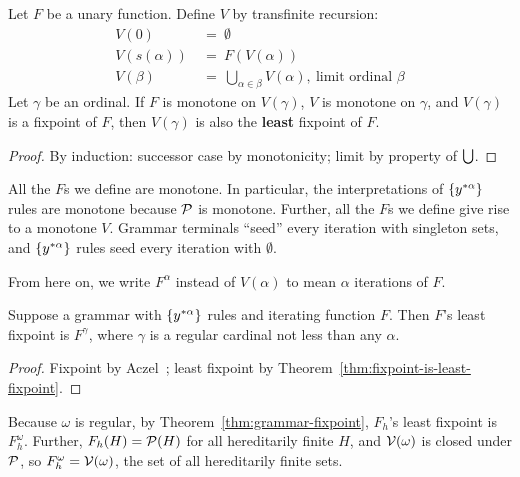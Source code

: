 \begin{theorem}
\label{thm:fixpoint-is-least-fixpoint}
Let $F$ be a unary function. Define $V$ by transfinite recursion:
\begin{equation}
\begin{aligned}
	V(0) &\ =\ \emptyset \\
	V(s(\alpha)) &\ =\ F(V(\alpha)) \\
	V(\beta) &\ =\ \bigcup_{\alpha \in \beta} V(\alpha),\ \text{limit ordinal } \beta
\end{aligned}
\end{equation}
Let $\gamma$ be an ordinal. If $F$ is monotone on $V(\gamma)$, $V$ is monotone on $\gamma$, and $V(\gamma)$ is a fixpoint of $F$, then $V(\gamma)$ is also the \textbf{least} fixpoint of $F$.
\end{theorem}
\begin{proof}
By induction: successor case by monotonicity; limit by property of $\textstyle\bigcup$.
\end{proof}

All the $F$s we define are monotone. In particular, the interpretations of $\{{{y}^{*{\alpha}}}\}$ rules are monotone because $\mathcal{P}$ is monotone. Further, all the $F$s we define give rise to a monotone $V$. Grammar terminals ``seed'' every iteration with singleton sets, and $\{{{y}^{*{\alpha}}}\}$ rules seed every iteration with $\emptyset$.

From here on, we write $F^\alpha$ instead of $V(\alpha)$ to mean $\alpha$ iterations of $F$.

\begin{theorem}
\label{thm:grammar-fixpoint}
Suppose a grammar with $\{{{y}^{*{\alpha}}}\}$ rules and iterating function $F$. Then $F$'s least fixpoint is $F^\gamma$, where $\gamma$ is a regular cardinal not less than any $\alpha$.
\end{theorem}
\begin{proof}
Fixpoint by Aczel~\cite[Theorem 1.3.4]{cit:aczel-1977-inductive}; least fixpoint by Theorem~\ref{thm:fixpoint-is-least-fixpoint}.
\end{proof}

\begin{example}
Because $\omega$ is regular, by Theorem~\ref{thm:grammar-fixpoint},  $F_h$'s least fixpoint is $F_h^\omega$.
Further, $F_h(H) = \mathcal{P}(H)$ for all hereditarily finite $H$, and $\mathcal{V}(\omega)$ is closed under $\mathcal{P}$, so $F_h^\omega = \mathcal{V}(\omega)$, the set of all hereditarily finite sets.
\exampleqed
\end{example}

